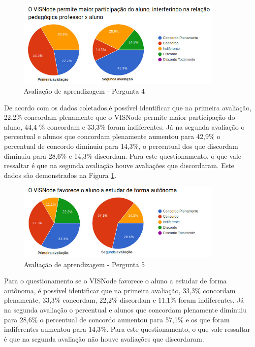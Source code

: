 \documentclass[
	12pt,				%
	oneside,			%
	a4paper,			%
	english,			%
	french,				%
	spanish,			%
	brazil,				%
	]{abntex2}
\begin{document}
\begin{figure}[H]
\centering
\caption{Avaliação de aprendizagem - Pergunta 4}\label{fig:avaliacaoAprendizagem4}
\includegraphics[width=0.9\textwidth]{imagens/avaliacoes/aprendizagem_4.jpg}
\sourceAuthor
\end{figure}

De acordo com os dados coletados,é possível identificar que na primeira avaliação, 22,2\% concordam plenamente que o VISNode permite maior participação do aluno, 44,4 \% concordam e 33,3\% foram indiferentes. Já na segunda avaliação o percentual e alunos que concordam plenamente aumentou para 42,9\% o percentual de concordo diminuiu para 14,3\%, o percentual dos que discordam diminuiu para 28,6\% e 14,3\% discordam. Para este questionamento, o que vale ressaltar é que na segunda avaliação houve avaliações que discordaram. Este dados são demonstrados na Figura \ref{fig:avaliacaoAprendizagem4}.

\begin{figure}[H]
\centering
\caption{Avaliação de aprendizagem - Pergunta 5}\label{fig:avaliacaoAprendizagem5}
\includegraphics[width=0.9\textwidth]{imagens/avaliacoes/aprendizagem_5.jpg}
\sourceAuthor
\end{figure}

Para o questionamento se o VISNode favorece o aluno a estudar de forma autônoma, é possível identificar que na primeira avaliação, 33,3\% concordam plenamente, 33,3\% concordam, 22,2\% discordam e 11,1\% foram indiferentes. Já na segunda avaliação o percentual e alunos que concordam plenamente diminuiu para 28,6\% o percentual de concordo aumentou para 57,1\% e os que foram indiferentes aumentou para 14,3\%. Para este questionamento, o que vale ressaltar é que na segunda avaliação não houve avaliações que discordaram.
\end{document}
